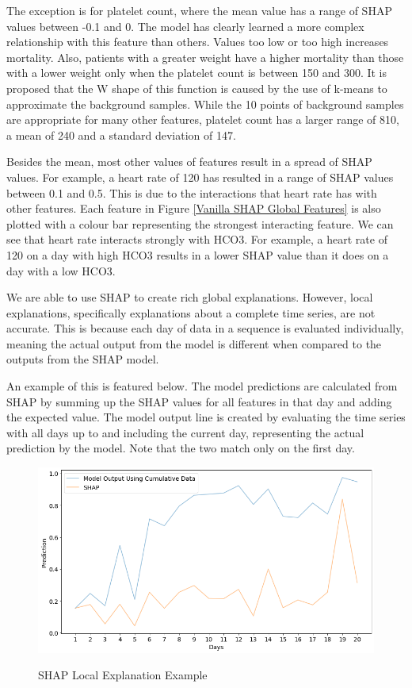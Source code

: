 \documentclass[12pt]{article}
\begin{document}
The exception is for platelet count, where the mean value has a range of SHAP values between -0.1 and 0. The model has clearly learned a more complex relationship with this feature than others. Values too low or too high increases mortality. Also, patients with a greater weight have a higher mortality than those with a lower weight only when the platelet count is between 150 and 300. It is proposed that the W shape of this function is caused by the use of k-means to approximate the background samples. While the 10 points of background samples are appropriate for many other features, platelet count has a larger range of 810, a mean of 240 and a standard deviation of 147.

Besides the mean, most other values of features result in a spread of SHAP values. For example, a heart rate of 120 has resulted in a range of SHAP values between 0.1 and 0.5. This is due to the interactions that heart rate has with other features. Each feature in Figure \ref{Vanilla SHAP Global Features} is also plotted with a colour bar representing the strongest interacting feature. We can see that heart rate interacts strongly with HCO3. For example, a heart rate of 120 on a day with high HCO3 results in a lower SHAP value than it does on a day with a low HCO3.

We are able to use SHAP to create rich global explanations. However, local explanations, specifically explanations about a complete time series, are not accurate. This is because each day of data in a sequence is evaluated individually, meaning the actual output from the model is different when compared to the outputs from the SHAP model.

An example of this is featured below. The model predictions are calculated from SHAP by summing up the SHAP values for all features in that day and adding the expected value. The model output line is created by evaluating the time series with all days up to and including the current day, representing the actual prediction by the model. Note that the two match only on the first day.

\begin{figure}[H]
\centering\caption{SHAP Local Explanation Example}
\includegraphics[scale=0.5]{Vanilla SHAP local1.png}
\label{SHAP Local Explanation Example}
\end{figure}
\end{document}
